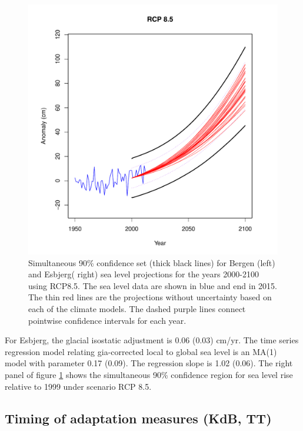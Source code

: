 \documentclass[draft,linenumbers]{agujournal}
\begin{document}
\begin{figure}
\begin{center}
\begin{minipage}{.5\textwidth}
    \includegraphics[width=\linewidth]{esbjerg_ci.pdf}

\end{minipage}
\caption{Simultaneous 90\% confidence set (thick black lines) for Bergen (left) and Esbjerg( right) sea level projections for the years 2000-2100 using RCP8.5. The sea level data are shown in blue and end in 2015. The thin red lines are the projections without uncertainty based on each of the climate models. The dashed purple lines connect pointwise confidence intervals for each year. }
\label{fig:ci}
\end{center}
\end{figure}

For Esbjerg, the glacial isostatic adjustment is 0.06 (0.03) cm/yr. The time series regression model relating gia-corrected local to global sea level is an MA(1) model with parameter 0.17 (0.09). The regression slope is 1.02 (0.06). The right panel of figure \ref{fig:ci} shows the simultaneous 90\% confidence region for sea level rise relative to 1999 under scenario RCP 8.5.


\subsection{Timing of adaptation measures {\color{blue} (KdB, TT)}}
\end{document}
